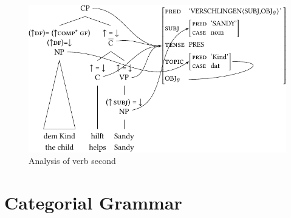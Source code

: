 \begin{enumerate}
\begin{figure}
\centerline{%
\includegraphics{Figures/dem-kind-hilft-sandy-lfg-lsp-crop}
}
\caption{\label{Abbildung-V2-dem-kind-hilft-sandy}Analysis of verb second}
\end{figure}%
\end{enumerate}

\pagebreak
\section{Categorial Grammar}

